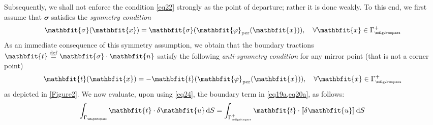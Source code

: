 \documentclass[12pt,a4paper]{article}
\renewcommand{\ta}[1]{\mathbfit{#1}}
\renewcommand{\ts}[1]{\mathbfit{#1}}
\renewcommand{\Box}{\mdlgwhtsquare}
\DeclarePairedDelimiter{\jmp}{[\![}{]\!]}
\newcommand{\per}{\mathrm{per}}
\newcommand{\rve}{
  {\mathchoice
   {\mbox{\scalebox{0.67}{$\Box$}}}
   {\mbox{\scalebox{0.67}{$\Box$}}}
   {\mbox{\scalebox{0.5}{$\Box$}}}
   {\mbox{\scalebox{0.375}{$\Box$}}}
  }
}
\begin{document}
Subsequently, we shall not enforce the condition \cref{eq22} strongly as the point of departure; rather it is done weakly.
To this end, we first assume that $\ts{\sigma}$ satisfies the \emph{symmetry condition}
\begin{equation}
    \ts{\sigma}(\ta{x}) = \ts{\sigma}(\ta{\varphi}_\per(\ta{x})), \quad
    \forall \ta{x}\in\Gamma_\rve^+
\label{eq23}
\end{equation}
As an immediate consequence of this symmetry assumption, we obtain that the boundary tractions $\ta{t}\defeq\ts{\sigma}\cdot\ta{n}$ satisfy the following \emph{anti-symmetry condition} for any mirror point (that is not a corner point)
\begin{equation}
    \ta{t}(\ta{x}) = -\ta{t}(\ta{\varphi}_\per(\ta{x})), \quad
    \forall \ta{x}\in\Gamma_\rve^+
\label{eq24}
\end{equation}
as depicted in \cref{Figure2}.
We now evaluate, upon using \cref{eq24}, the boundary term in
\cref{eq19a,eq20a}, as follows:
\begin{equation}
    \int_{\Gamma_\rve} \ta{t} \cdot \delta \ta{u} \dif S =
    \int_{\Gamma_\rve^+} \ta{t} \cdot \jmp{\delta \ta{u}} \dif S
\label{eq25}
\end{equation}
\end{document}
